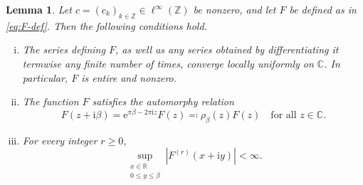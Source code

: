 \documentclass[11pt]{amsart}
\numberwithin{equation}{section}
\newtheorem{lemma}[theorem]{Lemma}
\theoremstyle{definition}
\theoremstyle{remark}
\newcommand{\R}{\mathbb R}
\newcommand{\C}{\mathbb C}
\newcommand{\Z}{\mathbb Z}
\newcommand{\ii}{\mathrm i}
\newcommand{\e}{\mathrm e}
\begin{document}
\begin{lemma}\label{lem:analytic-F}
    Let $c = (c_k)_{k\in \Z}\in\ell^\infty(\Z)$ be nonzero, and let $F$ be defined as in \eqref{eq:F-def}. Then the following conditions hold.
    \begin{enumerate}[(i)]
        \item\label{item:F_convergence}
        The series defining $F$, as well as any series obtained by differentiating it termwise any finite number of times, converge locally uniformly on $\C$. In particular, $F$ is entire and nonzero.
        \item\label{item:F_automorphy}
        The function $F$ satisfies the automorphy relation
        \begin{equation}\label{eq:quasiperiod-F}
          F(z+\ii\beta)=\e^{\pi\beta-2\pi\ii z}F(z)
          \eqqcolon \rho_\beta(z) F(z)
          \quad\text{for all }z\in\C.
        \end{equation}
        \item\label{item:F_bounded}
        For every integer $r\geq0$,
        \begin{equation}\label{eq:strip-bound-F}
          \sup_{\substack{x\in\R\\0\leq y\leq\beta}}
          |F^{(r)}(x+\ii y)|<\infty.
        \end{equation}
    \end{enumerate}
\end{lemma}
\end{document}

